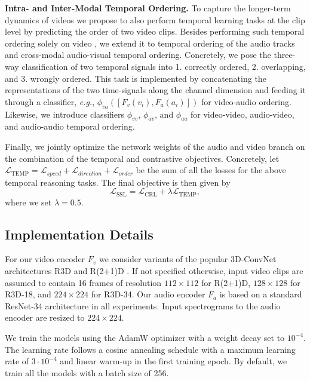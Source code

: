 \documentclass[letterpaper]{article} %
\newcommand{\eg}{\emph{e.g.}}
\begin{document}
\noindent \textbf{Intra- and Inter-Modal Temporal Ordering.}
To capture the longer-term dynamics of videos we propose to also perform temporal learning tasks at the clip level by predicting the order of two video clips.
Besides performing such temporal ordering solely on video \cite{jenni2021time,xu2019self,kim2019self}, we extend it to temporal ordering of the audio tracks and cross-modal audio-visual temporal ordering.
Concretely, we pose the three-way classification of two temporal signals into 1. correctly ordered, 2. overlapping, and 3. wrongly ordered.
This task is implemented by concatenating the representations of the two time-signals along the channel dimension and feeding it through a classifier, \eg, $\phi_{va}([F_v(v_i), F_a(a_i)])$ for video-audio ordering.
Likewise, we introduce classifiers $\phi_{vv}$, $\phi_{av}$, and $\phi_{aa}$ for video-video, audio-video, and audio-audio temporal ordering.


Finally, we jointly optimize the network weights of the audio and video branch on the combination of the temporal and contrastive objectives.
Concretely, let $\mathcal{L}_{\operatorname{TEMP}}=\mathcal{L}_{speed}+\mathcal{L}_{direction}+\mathcal{L}_{order}$ be the sum of all the losses for the above temporal reasoning tasks.
The final objective is then given by
\begin{equation}
    \mathcal{L}_{\operatorname{SSL}} = \mathcal{L}_{\operatorname{CRL}} + \lambda \mathcal{L}_{\operatorname{TEMP}},
\end{equation}
where we set $\lambda=0.5$.


\subsection{Implementation Details}

For our video encoder $F_v$ we consider variants of the popular 3D-ConvNet architectures R3D \cite{hara2018can} and R(2+1)D \cite{tran2018closer}.
If not specified otherwise, input video clips are assumed to contain 16 frames of resolution $112\times112$ for R(2+1)D, $128\times128$ for R3D-18,  and $224\times224$ for R3D-34.
Our audio encoder $F_a$ is based on a standard ResNet-34 \cite{he2016deep} architecture in all experiments.
Input spectrograms to the audio encoder are resized to $224\times224$.

We train the models using the AdamW optimizer \cite{loshchilov2018decoupled} with a weight decay set to $10^{-4}$.
The learning rate follows a cosine annealing schedule \cite{loshchilov2016sgdr} with a maximum learning rate of $3\cdot10^{-4}$ and linear warm-up in the first training epoch.
By default, we train all the models with a batch size of 256.
\end{document}
